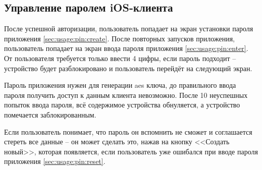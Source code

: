 \subsection{Управление паролем iOS-клиента}
\label{sec:usage:pin}

После успешной авторизации, пользователь попадает на экран установки пароля приложения \ref{sec:usage:pin:create}. После повторных запусков приложения, пользователь попадает на экран ввода пароля приложения \ref{sec:usage:pin:enter}. От пользователя требуется только ввести 4 цифры, если пароль подходит -- устройство будет разблокировано и пользователь перейдёт на следующий экран.

Пароль приложения нужен для генерации \gls{aes} ключа, до правильного ввода пароля получить доступ к данным клиента невозможно. После 10 неуспешных попыток ввода пароля, всё содержимое устройства обнуляется, а устройство помечается заблокированным.

Если пользователь понимает, что пароль он вспомнить не сможет и соглашается стереть все данные -- он может сделать это, нажав на кнопку <<Создать новый>>, которая появляется, если пользователь уже ошибался при вводе пароля приложения \ref{sec:usage:pin:reset}.

